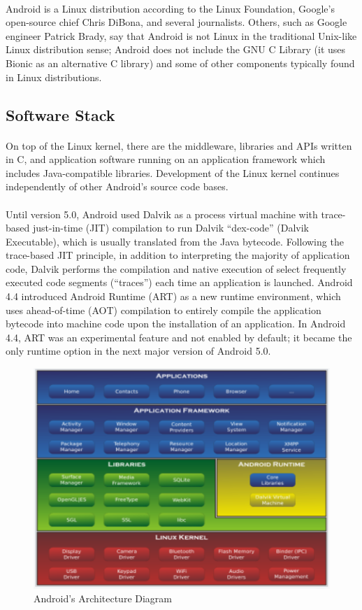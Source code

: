 \documentclass[a4paper,12pt]{report}
\begin{document}
\paragraph{}Android is a Linux distribution according to the Linux Foundation, Google's open-source chief Chris DiBona, and several journalists. Others, such as Google engineer Patrick Brady, say that Android is not Linux in the traditional Unix-like Linux distribution sense; Android does not include the GNU C Library (it uses Bionic as an alternative C library) and some of other components typically found in Linux distributions. 
\subsection{Software Stack}
\paragraph{}On top of the Linux kernel, there are the middleware, libraries and APIs written in C, and application software running on an application framework which includes Java-compatible libraries. Development of the Linux kernel continues independently of other Android's source code bases.
\paragraph{}Until version 5.0, Android used Dalvik as a process virtual machine with trace-based just-in-time (JIT) compilation to run Dalvik ``dex-code'' (Dalvik Executable), which is usually translated from the Java bytecode. Following the trace-based JIT principle, in addition to interpreting the majority of application code, Dalvik performs the compilation and native execution of select frequently executed code segments (``traces'') each time an application is launched. Android 4.4 introduced Android Runtime (ART) as a new runtime environment, which uses ahead-of-time (AOT) compilation to entirely compile the application bytecode into machine code upon the installation of an application. In Android 4.4, ART was an experimental feature and not enabled by default; it became the only runtime option in the next major version of Android 5.0.
\begin{figure}[!h]
	\begin{center}
		\includegraphics[width=.75\textwidth]{arc.png}    
		\caption{Android's Architecture Diagram}
		\label{fig1}
	\end{center}
\end{figure}
\end{document}
